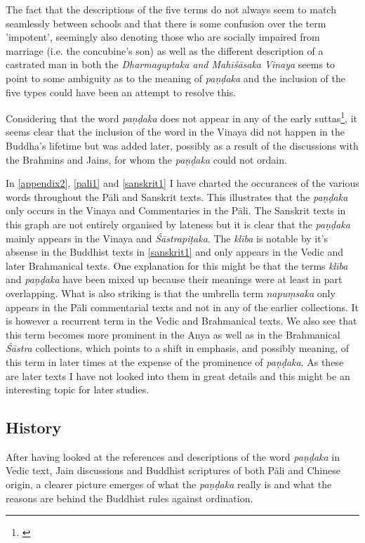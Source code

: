 The fact that the descriptions of the five terms do not always seem to match seamlessly between schools and that there is some confusion over the term 'impotent', seemingly also denoting those who are socially impaired from marriage (i.e. the concubine's son) as well as the different description of a castrated man in both the {\em Dharmaguptaka and Mahīśāsaka Vinaya} seems to point to some ambiguity as to the meaning of {\em paṇḍaka} and the inclusion of the five types could have been an attempt to resolve this.

Considering that the word {\em paṇḍaka} does not appear in any of the early suttas\footnote{\cite{vimala}}, it seems clear that the inclusion of the word in the Vinaya did not happen in the Buddha's lifetime but was added later, possibly as a result of the discussions with the Brahmins and Jains, for whom the {\em paṇḍaka} could not ordain.

In \ref{appendix2}, \ref{pali1} and \ref{sanskrit1} I have charted the occurances of the various words throughout the Pāli and Sanskrit texts. This illustrates that the {\em paṇḍaka} only occurs in the Vinaya and Commentaries in the Pāli. The Sanskrit texts in this graph are not entirely organised by lateness but it is clear that the {\em paṇḍaka} mainly appears in the Vinaya and {\em Śāstrapiṭaka}. The {\em klība} is notable by it's absense in the Buddhist texts in \ref{sanskrit1} and only appears in the Vedic and later Brahmanical texts. One explanation for this might be that the terms {\em klība} and {\em paṇḍaka} have been mixed up because their meanings were at least in part overlapping. What is also striking is that the umbrella term {\em napuṃsaka} only appears in the Pāli commentarial texts and not in any of the earlier collections. It is however a recurrent term in the Vedic and Brahmanical texts. We also see that this term becomes more prominent in the Anya as well as in the Brahmanical {\em Śāstra} collections, which points to a shift in emphasis, and possibly meaning, of this term in later times at the expense of the prominence of {\em paṇḍaka}. As these are later texts I have not looked into them in great details and this might be an interesting topic for later studies.

\subsection{History}
After having looked at the references and descriptions of the word {\em paṇḍaka} in Vedic text, Jain discussions and Buddhist scriptures of both Pāli and Chinese origin, a clearer picture emerges of what the {\em paṇḍaka} really is and what the reasons are behind the Buddhist rules against ordination.

